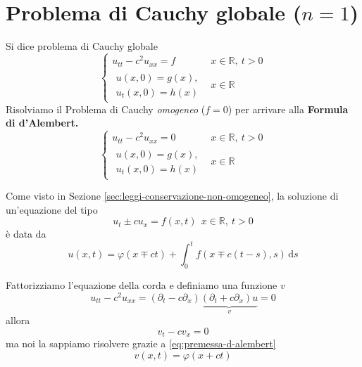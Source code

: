 \documentclass[10pt,a4paper,twoside,openright]{book}
\newcommand{\de}{\,\mathrm d}
\newcommand{\ds}{\de s}
\begin{document}
\section{Problema di Cauchy globale \texorpdfstring{($n=1$)}{(n=1)}}

Si dice problema di Cauchy globale
\begin{equation*}
	\begin{cases}
		u_{tt} -c^{2} u_{xx} =f & x\in \mathbb{R} ,\ t >0 \\
		\begin{array}{l}
		u(x,0) =g(x) ,\\
		u_{t}(x,0) =h(x)
		\end{array}             & x\in \mathbb{R}         
	\end{cases}
\end{equation*}
Risolviamo il Problema di Cauchy \textit{omogeneo} ($f=0$) per arrivare alla \textbf{Formula di d'Alembert.}
\begin{equation*}
	\begin{cases}
	u_{tt} -c^{2} u_{xx} =0 & x\in \mathbb{R} ,\ t >0\\
	\begin{array}{l}
		u(x,0) =g(x) ,   \\
		u_{t}(x,0) =h(x) 
	\end{array} & x\in \mathbb{R}
	\end{cases}
\end{equation*}
\begin{nb}
	Come visto in Sezione \ref{sec:leggi-conservazione-non-omogeneo}, la soluzione di un'equazione del tipo
	\begin{equation*}
		u_{t} \pm cu_{x} =f(x,t) \ \ x\in \mathbb{R} ,\ t >0
	\end{equation*}
	è data da
	\begin{equation}
		u(x,t) =\varphi (x\mp ct) +\int ^{t}_{0} f(x \mp c(t-s) ,s) \ds
		\label{eq:premessa-d-alembert}
	\end{equation}
\end{nb}
Fattorizziamo l'equazione della corda e definiamo una funzione $v$
\begin{equation*}
	u_{tt} -c^{2} u_{xx} =(\partial _{t} -c\partial _{x})\underbrace{(\partial _{t} +c\partial _{x}) u}_{v} =0
\end{equation*}
allora
\begin{equation*}
	v_{t} -cv_{x} =0
\end{equation*}
ma noi la sappiamo risolvere grazie a \eqref{eq:premessa-d-alembert}
\begin{equation*}
	v(x,t) =\varphi (x+ct)
\end{equation*}
\end{document}
